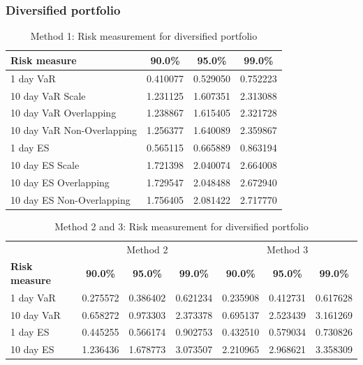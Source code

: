 \subsubsection{Diversified portfolio}
\begin{table}[H]
    \centering
    \begin{tabular}{@{} l c c c @{}}
        \toprule
        \textbf{Risk measure} & \textbf{90.0\%} & \textbf{95.0\%} & \textbf{99.0\%} \\
        \midrule
        1 day VaR & 0.410077 & 0.529050 & 0.752223 \\
        10 day VaR Scale & 1.231125 & 1.607351 & 2.313088 \\
        10 day VaR Overlapping & 1.238867 & 1.615405 & 2.321728 \\
        10 day VaR Non-Overlapping & 1.256377 & 1.640089 & 2.359867 \\
        1 day ES & 0.565115 & 0.665889 & 0.863194 \\
        10 day ES Scale & 1.721398 & 2.040074 & 2.664008 \\
        10 day ES Overlapping & 1.729547 & 2.048488 & 2.672940 \\
        10 day ES Non-Overlapping & 1.756405 & 2.081422 & 2.717770 \\
        \bottomrule
    \end{tabular}
    \caption{Method 1: Risk measurement for diversified portfolio}
    \label{tab:method_1_diversified_port}
\end{table}
\begin{table}[H]
    \centering
    \begin{tabular}{@{} l c c c | c c c @{}}
        \toprule
        &\multicolumn{3}{c}{Method 2}&\multicolumn{3}{c}{Method 3}\\
        \textbf{Risk measure} & \textbf{90.0\%} & \textbf{95.0\%} & \textbf{99.0\%}& \textbf{90.0\%} & \textbf{95.0\%} & \textbf{99.0\%} \\
        \midrule
        1 day VaR & 0.275572 & 0.386402 & 0.621234 & 0.235908 & 0.412731 & 0.617628\\
        10 day VaR & 0.658272 & 0.973303 & 2.373378 & 0.695137 & 2.523439 & 3.161269 \\
        1 day ES & 0.445255 & 0.566174 & 0.902753 & 0.432510 & 0.579034 & 0.730826 \\
        10 day ES & 1.236436 & 1.678773 & 3.073507 & 2.210965 & 2.968621 & 3.358309 \\
        \bottomrule
    \end{tabular}
    \caption{Method 2 and 3: Risk measurement for diversified portfolio}
    \label{tab:method_2_and_3_diversified_port}
\end{table}
